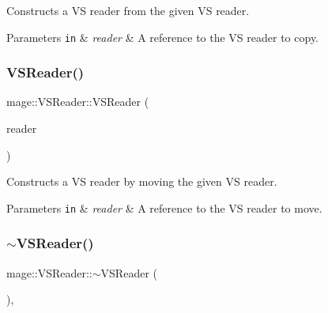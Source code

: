 Constructs a VS reader from the given VS reader.


\begin{DoxyParams}[1]{Parameters}
\mbox{\tt in}  & {\em reader} & A reference to the VS reader to copy. \\
\hline
\end{DoxyParams}
\hypertarget{classmage_1_1_v_s_reader_aa7bb7d1792d4eef4734b4d4daa6e2ce7}{}\label{classmage_1_1_v_s_reader_aa7bb7d1792d4eef4734b4d4daa6e2ce7} 
\subsubsection{\texorpdfstring{V\+S\+Reader()}{VSReader()}\hspace{0.1cm}{\footnotesize\ttfamily [3/3]}}
{\footnotesize\ttfamily mage\+::\+V\+S\+Reader\+::\+V\+S\+Reader (\begin{DoxyParamCaption}\item[{\hyperlink{classmage_1_1_v_s_reader}{V\+S\+Reader} \&\&}]{reader }\end{DoxyParamCaption})\hspace{0.3cm}{\ttfamily [default]}}

Constructs a VS reader by moving the given VS reader.


\begin{DoxyParams}[1]{Parameters}
\mbox{\tt in}  & {\em reader} & A reference to the VS reader to move. \\
\hline
\end{DoxyParams}
\hypertarget{classmage_1_1_v_s_reader_ae3cb230b06f289adae239b785f1fabc6}{}\label{classmage_1_1_v_s_reader_ae3cb230b06f289adae239b785f1fabc6} 
\subsubsection{\texorpdfstring{$\sim$\+V\+S\+Reader()}{~VSReader()}}
{\footnotesize\ttfamily mage\+::\+V\+S\+Reader\+::$\sim$\+V\+S\+Reader (\begin{DoxyParamCaption}{ }\end{DoxyParamCaption})\hspace{0.3cm}{\ttfamily [virtual]}, {\ttfamily [default]}}

